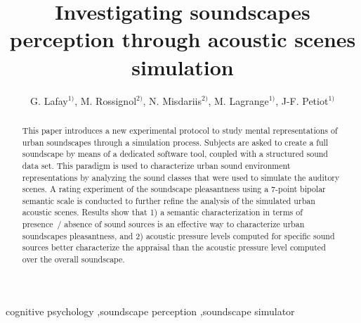 \documentclass[12pt]{elsarticle}
\begin{document}
\begin{frontmatter}


    \author{G. Lafay$^{1)}$, M. Rossignol$^{2)}$, N. Misdariis$^{2)}$, M. Lagrange$^{1)}$, J-F. Petiot$^{1)}$}

    \address{$^{1)}$ Laboratoire des Sciences du Numérique de Nantes-CNRS-\'Ecole Centrale de Nantes, Nantes, France.\\
    \hspace*{8pt}mathieu.lagrange@cnrs.fr\\
    $^{2)}$ STMS Ircam-CNRS-UPMC Institut de Recherche et Coordination Acoustique/Musique, Paris, France}


    \title{Investigating soundscapes perception through acoustic scenes simulation}

  \begin{abstract}
    This paper introduces a new experimental protocol to study mental representations of urban soundscapes through a simulation process. Subjects are asked to create a full soundscape by means of a dedicated software tool, coupled with a structured sound data set. This paradigm is used to characterize urban sound environment representations by analyzing the sound classes that were used to simulate the auditory scenes. A rating experiment of the soundscape pleasantness using a 7-point bipolar semantic scale is conducted to further refine the analysis of the simulated urban acoustic scenes. Results show that 1) a semantic characterization in terms of presence~/ absence of sound sources is an effective way to characterize urban soundscapes pleasantness, and 2) acoustic pressure levels computed for specific sound sources better characterize the appraisal than the acoustic pressure level computed over the overall soundscape.
  \end{abstract}

  \begin{keyword}
 cognitive psychology \sep soundscape perception \sep soundscape simulator


  \end{keyword}

\end{frontmatter}


\end{document}
